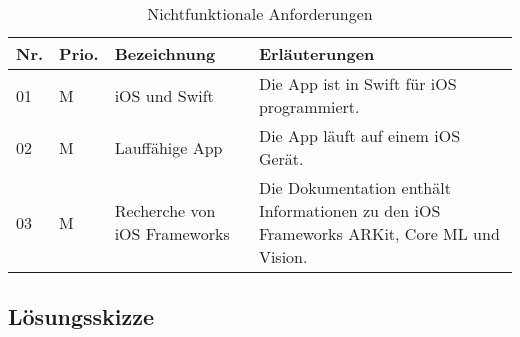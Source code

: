 \begin{table}
	\begin{tabular}{l l p{4.7cm} p{8cm}}
		\hline
		\textbf{Nr.} & \textbf{Prio.} & \textbf{Bezeichnung} & \textbf{Erläuterungen} \\
		\hline
		01 & M & iOS und Swift & Die App ist in Swift für iOS programmiert. \\
		02 & M & Lauffähige App & Die App läuft auf einem iOS Gerät. \\
		03 & M & Recherche von iOS Frameworks & Die Dokumentation enthält Informationen zu den iOS Frameworks ARKit, Core ML und Vision. \\
		\hline
	\end{tabular}
	\caption{Nichtfunktionale Anforderungen}
	\label{tab:nichtfunktionale-anforderungen}
\end{table}

\subsection{Lösungsskizze}
